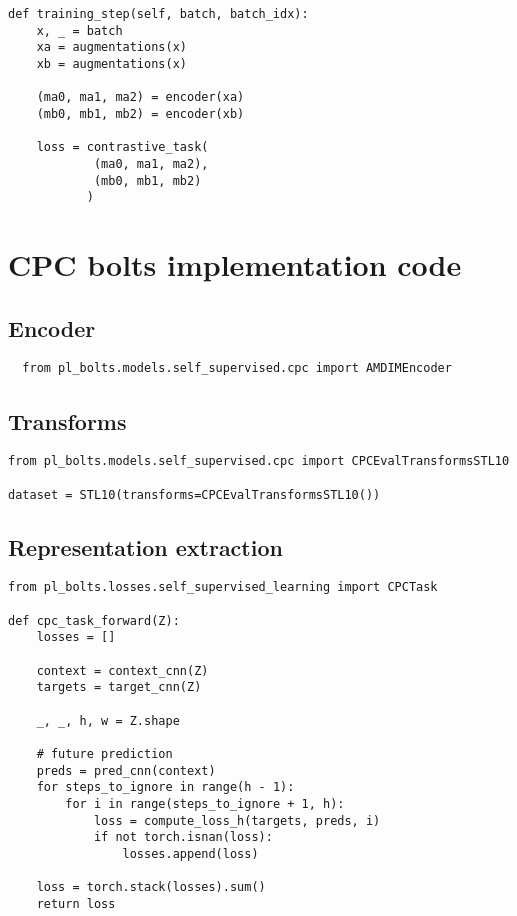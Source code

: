 \documentclass{article}
\begin{document}
\begin{lstlisting}
def training_step(self, batch, batch_idx):
    x, _ = batch
    xa = augmentations(x)
    xb = augmentations(x)
    
    (ma0, ma1, ma2) = encoder(xa)
    (mb0, mb1, mb2) = encoder(xb)
    
    loss = contrastive_task(
            (ma0, ma1, ma2), 
            (mb0, mb1, mb2)
           )
\end{lstlisting}

\section{CPC bolts implementation code}\label{ap:cpc}

\subsection{Encoder}

\begin{lstlisting}
  from pl_bolts.models.self_supervised.cpc import AMDIMEncoder
\end{lstlisting}

\subsection{Transforms}

\begin{lstlisting}
from pl_bolts.models.self_supervised.cpc import CPCEvalTransformsSTL10

dataset = STL10(transforms=CPCEvalTransformsSTL10())
\end{lstlisting}

\subsection{Representation extraction}
\begin{lstlisting}
from pl_bolts.losses.self_supervised_learning import CPCTask

def cpc_task_forward(Z):
    losses = []

    context = context_cnn(Z)
    targets = target_cnn(Z)

    _, _, h, w = Z.shape

    # future prediction
    preds = pred_cnn(context)
    for steps_to_ignore in range(h - 1):
        for i in range(steps_to_ignore + 1, h):
            loss = compute_loss_h(targets, preds, i)
            if not torch.isnan(loss):
                losses.append(loss)

    loss = torch.stack(losses).sum()
    return loss
\end{lstlisting}
\end{document}
